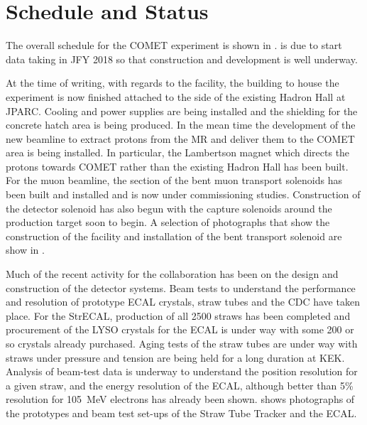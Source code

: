 
\section{Schedule and Status}
\FigSchedule
The overall schedule for the COMET experiment is shown in .
\phaseI is due to start data taking in \ac{JFY} 2018 so that construction and development is well underway.

At the time of writing, with regards to the facility, the building to house the experiment is now finished attached to the side of the existing Hadron Hall at \ac{JPARC}.
Cooling and power supplies are being installed and the shielding for the concrete hatch area is being produced.
In the mean time the development of the new beamline to extract protons from the \ac{MR} and deliver them to the COMET area is being installed.
In particular, the Lambertson magnet which directs the protons towards COMET rather than the existing Hadron Hall has been built.
For the muon beamline, the \phaseI section of the bent muon transport solenoids has been built and installed and is now under commissioning studies.
Construction of the detector solenoid has also begun with the capture solenoids around the production target soon to begin.
A selection of photographs that show the construction of the facility and installation of the bent transport solenoid are show in .

Much of the recent activity for the collaboration has been on the design and construction of the detector systems.
Beam tests to understand the performance and resolution of prototype ECAL crystals, straw tubes and the \ac{CDC} have taken place.
For the \ac{StrECAL}, production of all 2500 \phaseI straws has been completed and procurement of the \ac{LYSO} crystals for the ECAL is under way with some 200 or so crystals already purchased.
Aging tests of the straw tubes are under way with straws under pressure and tension are being held for a long duration at KEK.
Analysis of beam-test data is underway to understand the position resolution for a given straw, and the energy resolution of the ECAL, although better than 5\% resolution for 105~MeV electrons has already been shown.
 shows photographs of the prototypes and beam test set-ups of the Straw Tube Tracker and the ECAL.

